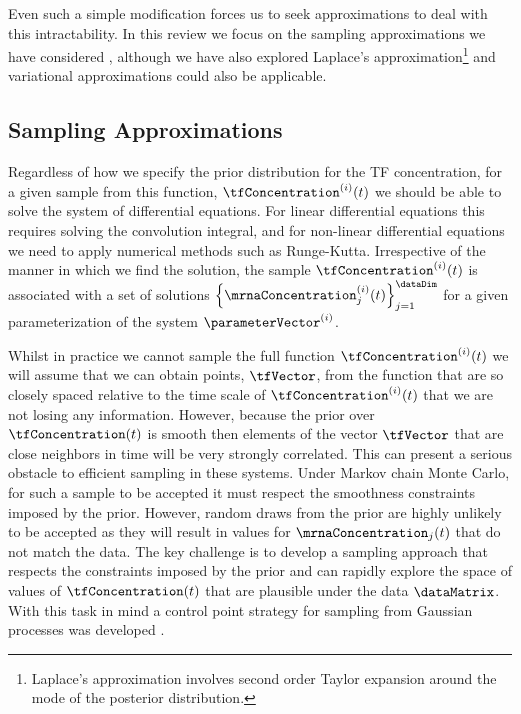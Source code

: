 \documentclass{article}
\begin{document}
Even such a simple modification forces us to seek approximations to
deal with this intractability. In this review we focus on the sampling
approximations we have considered
\citep{Titsias:efficient08,Titsias:mcmcgp11}, although we have also
explored Laplace's approximation\footnote{Laplace's approximation
  involves second order Taylor expansion around the mode of the
  posterior distribution.}
\citep[see][]{Lawrence:transcriptionalGP06,Gao:latent08,Lawrence:licsbgp10}
and variational approximations could also be applicable.

\subsection{Sampling Approximations}

Regardless of how we specify the prior distribution for the TF
concentration, for a given sample from this function,
$\tfConcentration^{(i)}(t)$ we should be able to solve the system of
differential equations. For linear differential equations this
requires solving the convolution integral, and for non-linear
differential equations we need to apply numerical methods such as
Runge-Kutta. Irrespective of the manner in which we find the solution,
the sample $\tfConcentration^{(i)}(t)$ is associated with a set of
solutions
$\left\{\mrnaConcentration_j^{(i)}(t)\right\}_{j=1}^\dataDim$ for a
given parameterization of the system $\parameterVector^{(i)}$.

Whilst in practice we cannot sample the full function
$\tfConcentration^{(i)}(t)$ we will assume that we can obtain points,
$\tfVector$, from the function that are so closely spaced relative to
the time scale of $\tfConcentration^{(i)}(t)$ that we are not losing
any information. However, because the prior over $\tfConcentration(t)$
is smooth then elements of the vector $\tfVector$ that are close
neighbors in time will be very strongly correlated. This can present a
serious obstacle to efficient sampling in these systems. Under Markov
chain Monte Carlo, for such a sample to be accepted it must respect
the smoothness constraints imposed by the prior. However, random draws
from the prior are highly unlikely to be accepted as they will result
in values for $\mrnaConcentration_j(t)$ that do not match the
data. The key challenge is to develop a sampling approach that
respects the constraints imposed by the prior and can rapidly explore
the space of values of $\tfConcentration(t)$ that are plausible under
the data $\dataMatrix$. With this task in mind a control point
strategy for sampling from Gaussian processes was developed
\citep{Titsias:efficient08,Titsias:mcmcgp11}.
\end{document}
